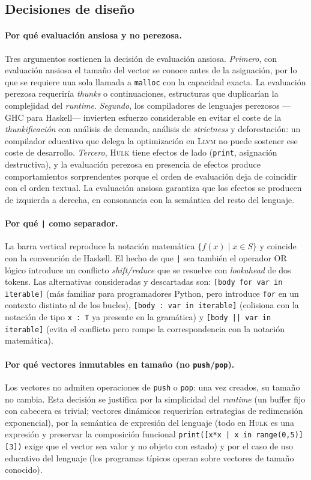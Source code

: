 \documentclass[11pt,a4paper,oneside,openany]{report}
\newcommand{\hulk}{\textsc{Hulk}}
\newcommand{\code}[1]{\texttt{#1}}
\newcommand{\llvm}{\textsc{Llvm}}
\begin{document}
\subsection{Decisiones de diseño}

\paragraph{Por qué evaluación ansiosa y no perezosa.}
Tres argumentos sostienen la decisión de evaluación ansiosa.
\emph{Primero}, con evaluación ansiosa el tamaño del vector se conoce
antes de la asignación, por lo que se requiere una sola llamada a
\code{malloc} con la capacidad exacta. La evaluación perezosa requeriría
\emph{thunks} o continuaciones, estructuras que duplicarían la complejidad
del \textit{runtime}. \emph{Segundo}, los compiladores de lenguajes
perezosos ---GHC para Haskell--- invierten esfuerzo considerable en
evitar el coste de la \emph{thunkificación} con análisis de demanda,
análisis de \emph{strictness} y deforestación: un compilador educativo que
delega la optimización en \llvm{} no puede sostener ese coste de
desarrollo. \emph{Tercero}, \hulk{} tiene efectos de lado (\code{print},
asignación destructiva), y la evaluación perezosa en presencia de efectos
produce comportamientos sorprendentes porque el orden de evaluación deja
de coincidir con el orden textual. La evaluación ansiosa garantiza que los
efectos se producen de izquierda a derecha, en consonancia con la
semántica del resto del lenguaje.

\paragraph{Por qué \code{|} como separador.}
La barra vertical reproduce la notación matemática $\{f(x) \mid x \in S\}$
y coincide con la convención de Haskell. El hecho de que \code{|} sea
también el operador OR lógico introduce un conflicto \emph{shift/reduce}
que se resuelve con \emph{lookahead} de dos tokens. Las alternativas
consideradas y descartadas son: \code{[body for var in iterable]} (más
familiar para programadores Python, pero introduce \code{for} en un
contexto distinto al de los bucles), \code{[body : var in iterable]}
(colisiona con la notación de tipo \code{x : T} ya presente en la
gramática) y \code{[body || var in iterable]} (evita el conflicto pero
rompe la correspondencia con la notación matemática).

\paragraph{Por qué vectores inmutables en tamaño (no \code{push}/\code{pop}).}
Los vectores no admiten operaciones de \code{push} o \code{pop}: una vez
creados, su tamaño no cambia. Esta decisión se justifica por la
simplicidad del \textit{runtime} (un buffer fijo con cabecera es trivial;
vectores dinámicos requerirían estrategias de redimensión exponencial),
por la semántica de expresión del lenguaje (todo en \hulk{} es una
expresión y preservar la composición funcional
\code{print([x*x | x in range(0,5)][3])} exige que el vector sea valor y
no objeto con estado) y por el caso de uso educativo del lenguaje (los
programas típicos operan sobre vectores de tamaño conocido).
\end{document}
